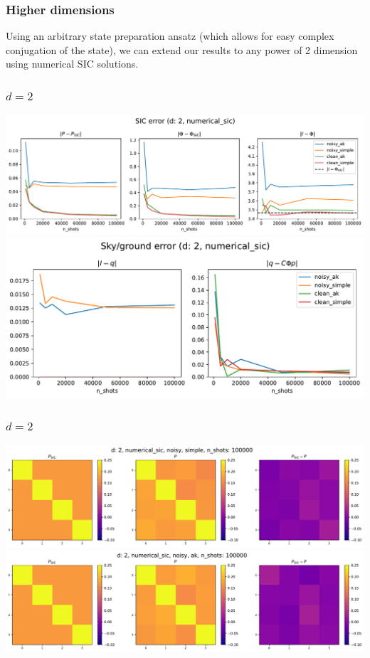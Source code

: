 \documentclass{beamer}
\begin{document}
\begin{frame}
\frametitle{Higher dimensions}
Using an arbitrary state preparation ansatz (which allows for easy complex conjugation of the state), we can extend our results to any power of 2 dimension using numerical SIC solutions.	
\end{frame}

\begin{frame}
\frametitle{$d=2$}
\begin{center}
\includegraphics[scale=0.35]{img/sic_metrics_d2_numerical_sic}
\includegraphics[scale=0.35]{img/sg_metrics_d2_numerical_sic}		
\end{center}
\end{frame}

\begin{frame}
\frametitle{$d=2$}
\begin{center}
\includegraphics[scale=0.3]{img/P_d2_numerical_sic_noisy_simple_n100000}
\includegraphics[scale=0.3]{img/P_d2_numerical_sic_noisy_ak_n100000}		
\end{center}
\end{frame}
\end{document}
